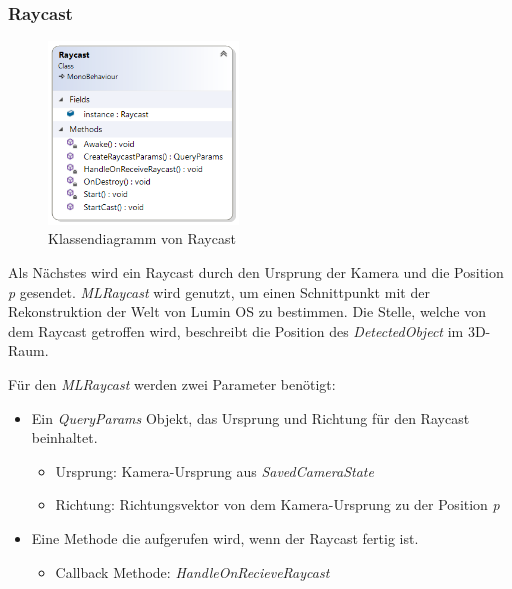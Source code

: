 \subsubsection{Raycast}

\begin{figure}[H]
	\centering
	\includegraphics[width=0.45\textwidth]{images/dia_raycast.PNG}
	\caption[Klassendiagramm von Raycast]{Klassendiagramm von Raycast}
	\label{dia:raycast}
\end{figure}

Als Nächstes wird ein Raycast durch den Ursprung der Kamera und die Position \textit{p} gesendet. \textit{MLRaycast} wird genutzt, um einen Schnittpunkt mit der Rekonstruktion der Welt von Lumin OS zu bestimmen. Die Stelle, welche von dem Raycast getroffen wird, beschreibt die Position des \textit{DetectedObject} im 3D-Raum.

Für den \textit{MLRaycast} werden zwei Parameter benötigt:
\begin{itemize}
	\item Ein \textit{QueryParams} Objekt, das Ursprung und Richtung für den Raycast beinhaltet.
	\begin{itemize}
		\item Ursprung: Kamera-Ursprung aus \textit{SavedCameraState}
		\item Richtung: Richtungsvektor von dem Kamera-Ursprung zu der Position \textit{p}
	\end{itemize}
	\item Eine Methode die aufgerufen wird, wenn der Raycast fertig ist. 
	\begin{itemize}
		\item Callback Methode: \textit{HandleOnRecieveRaycast}
	\end{itemize}
\end{itemize}

